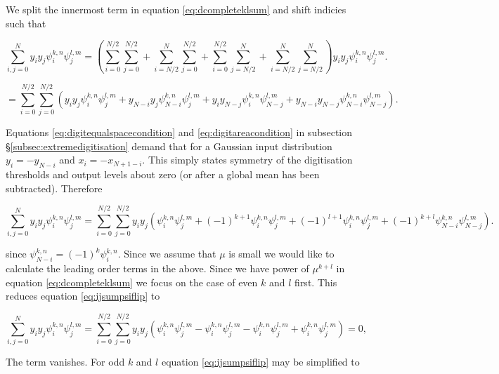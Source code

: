 \documentclass[apj]{emulateapj}
\begin{document}
We split the innermost term in equation \ref{eq:dcompleteklsum} and shift indicies such that

\begin{equation}
\sum_{i,j = 0}^N y_i y_j \psi_i^{k, n} \psi_j^{l, m} = \left( \sum_{i = 0}^{N/2}\sum_{j = 0}^{N/2} + \sum_{i = N/2}^{N}\sum_{j = 0}^{N/2} + \sum_{i = 0}^{N/2}\sum_{j = N/2}^{N} + \sum_{i = N/2}^{N}\sum_{j = N/2}^{N} \right) y_i y_j \psi_i^{k, n} \psi_j^{l, m}.
\end{equation}

\begin{equation}
= \sum_{i = 0}^{N/2}\sum_{j = 0}^{N/2} \left( y_i y_j \psi_i^{k, n} \psi_j^{l, m} +  y_{N-i} y_j \psi_{N-i}^{k, n} \psi_j^{l, m} + y_i y_{N-j} \psi_i^{k, n} \psi_{N-j}^{l, m} + y_{N-i} y_{N-j} \psi_{N-i}^{k, n} \psi_{N-j}^{l, m} \right).
\end{equation}

Equations \ref{eq:digitequalspacecondition} and \ref{eq:digitareacondition} in subsection \S\ref{subsec:extremedigitisation} demand that for a Gaussian input distribution $y_i = -y_{N-i}$ and $x_i = -x_{N+1-i}$. This simply states symmetry of the digitisation thresholds and output levels about zero (or after a global mean has been subtracted). Therefore

\begin{equation} \label{eq:ijsumpsiflip}
\sum_{i,j = 0}^N y_i y_j \psi_i^{k, n} \psi_j^{l, m} = \sum_{i = 0}^{N/2}\sum_{j = 0}^{N/2} y_i y_j \left( \psi_i^{k, n} \psi_j^{l, m} + (-1)^{k+1} \psi_{i}^{k, n} \psi_j^{l, m} + (-1)^{l+1} \psi_i^{k, n} \psi_{j}^{l, m} + (-1)^{k+l} \psi_{N-i}^{k, n} \psi_{N-j}^{l, m} \right).
\end{equation}

since $\psi_{N-i}^{k,n} = (-1)^{k} \psi_{i}^{k,n}$. Since we assume that $\mu$ is small we would like to calculate the leading order terms in the above. Since we have power of $\mu^{k+l}$ in equation \ref{eq:dcompleteklsum} we focus on the case of even $k$ and $l$ first. This reduces equation \ref{eq:ijsumpsiflip} to

\begin{equation}
\sum_{i,j = 0}^N y_i y_j \psi_i^{k, n} \psi_j^{l, m} = \sum_{i = 0}^{N/2}\sum_{j = 0}^{N/2} y_i y_j  \left( \psi_i^{k, n} \psi_j^{l, m} - \psi_{i}^{k, n} \psi_j^{l, m} - \psi_i^{k, n} \psi_{j}^{l, m} + \psi_{i}^{k, n} \psi_{j}^{l, m} \right) = 0,
\end{equation}

The term vanishes. For odd $k$ and $l$ equation \ref{eq:ijsumpsiflip} may be simplified to
\end{document}
